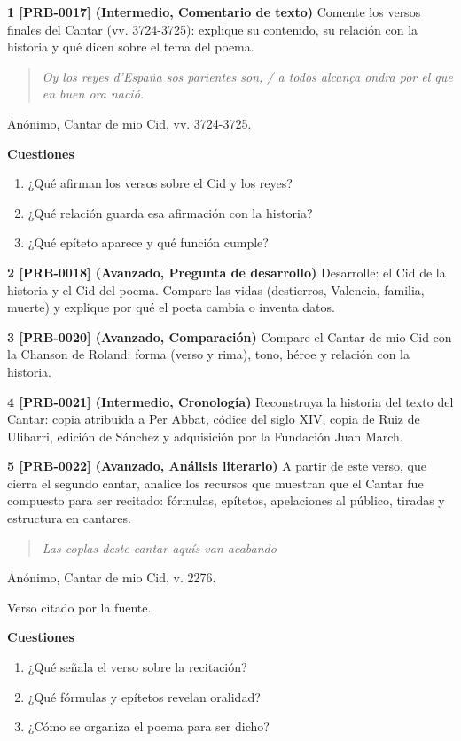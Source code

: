 \documentclass{book}
\begin{document}
\begin{tcolorbox}[title={Ejercicios}, studiumworked, breakable]

\noindent\textbf{1 [PRB-0017] (Intermedio, Comentario de texto)}
Comente los versos finales del Cantar (vv. 3724-3725): explique su contenido, su relación con la historia y qué dicen sobre el tema del poema.


\begin{quote}
\itshape Oy los reyes d'España sos parientes son, / a todos alcança ondra por el que en buen ora nació.
\end{quote}
{\noindent\footnotesize Anónimo, Cantar de mio Cid, vv. 3724-3725.\par}

\noindent\textbf{Cuestiones}
\begin{enumerate}
\item ¿Qué afirman los versos sobre el Cid y los reyes?
\item ¿Qué relación guarda esa afirmación con la historia?
\item ¿Qué epíteto aparece y qué función cumple?
\end{enumerate}

\noindent\textbf{2 [PRB-0018] (Avanzado, Pregunta de desarrollo)}
Desarrolle: el Cid de la historia y el Cid del poema. Compare las vidas (destierros, Valencia, familia, muerte) y explique por qué el poeta cambia o inventa datos.


\noindent\textbf{3 [PRB-0020] (Avanzado, Comparación)}
Compare el Cantar de mio Cid con la Chanson de Roland: forma (verso y rima), tono, héroe y relación con la historia.


\noindent\textbf{4 [PRB-0021] (Intermedio, Cronología)}
Reconstruya la historia del texto del Cantar: copia atribuida a Per Abbat, códice del siglo XIV, copia de Ruiz de Ulibarri, edición de Sánchez y adquisición por la Fundación Juan March.


\noindent\textbf{5 [PRB-0022] (Avanzado, Análisis literario)}
A partir de este verso, que cierra el segundo cantar, analice los recursos que muestran que el Cantar fue compuesto para ser recitado: fórmulas, epítetos, apelaciones al público, tiradas y estructura en cantares.


\begin{quote}
\itshape Las coplas deste cantar aquís van acabando
\end{quote}
{\noindent\footnotesize Anónimo, Cantar de mio Cid, v. 2276.\par}
{\noindent\footnotesize Verso citado por la fuente.\par}

\noindent\textbf{Cuestiones}
\begin{enumerate}
\item ¿Qué señala el verso sobre la recitación?
\item ¿Qué fórmulas y epítetos revelan oralidad?
\item ¿Cómo se organiza el poema para ser dicho?
\end{enumerate}
\end{tcolorbox}
\end{document}
